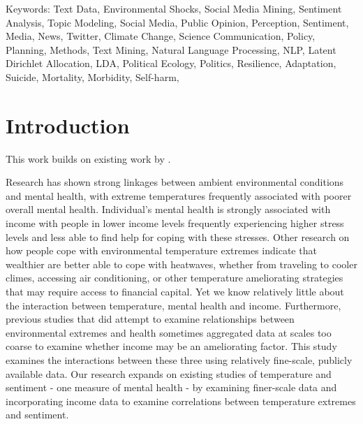 \documentclass{article}
\begin{document}
Keywords: Text Data, Environmental Shocks, Social Media Mining, Sentiment Analysis, Topic Modeling, Social Media, Public Opinion, Perception, Sentiment, Media, News, Twitter, Climate Change, Science Communication, Policy, Planning, Methods, Text Mining, Natural Language Processing, NLP, Latent Dirichlet Allocation, LDA, Political Ecology, Politics, Resilience, Adaptation, Suicide, Mortality, Morbidity, Self-harm, 

    
\section{Introduction}



This work builds on existing work by \citep{baylis_weather_2018}. 

Research has shown strong linkages between ambient environmental conditions and mental health, with extreme temperatures  frequently associated with poorer overall mental health. Individual's mental health is strongly associated with income with people in lower income levels frequently experiencing higher stress levels and less able to find help for coping with these stresses. Other research on how people cope with environmental temperature extremes indicate that wealthier are better able to cope with heatwaves, whether from traveling to cooler climes, accessing air conditioning, or other temperature ameliorating strategies that may require access to financial capital. Yet we know relatively little about the interaction between temperature, mental health and income. Furthermore, previous studies that did attempt to examine relationships between environmental extremes and health sometimes aggregated data at scales too coarse to examine whether income may be an ameliorating factor. This study examines the interactions between these three using relatively fine-scale, publicly available data. Our research expands on existing studies of temperature and sentiment - one measure of mental health - by examining finer-scale data and incorporating income data to examine correlations between temperature extremes and sentiment.
\end{document}
